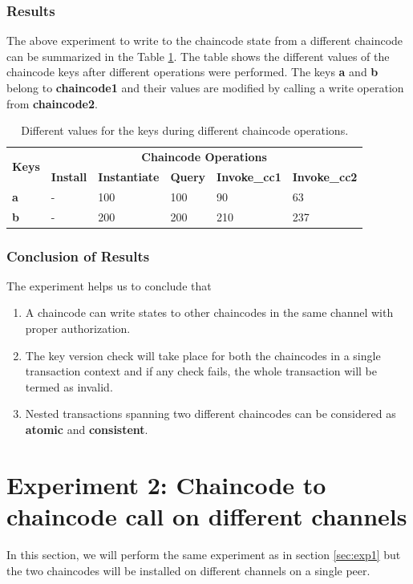 \documentclass[
  a4paper,  %
  twoside,  %
  bibliography=totoc,
  headsepline,
  cleardoublepage=empty,
  parskip=half,
  draft=false
]{scrbook}
\begin{document}
\subsubsection{Results}
The above experiment to write to the chaincode state from a  different chaincode can be summarized in the Table \ref{tab:result2}. The table shows the different values of the chaincode keys after different operations were performed. The keys \textbf{a} and \textbf{b} belong to \textbf{chaincode1} and their values are modified by calling a write operation from \textbf{chaincode2}.
\begin{table}[h!]
\begin{center}
    \begin{tabular}{ |l|l|l|l|l|l|}
    \hline
    \multirow{2}{*}{\textbf{Keys}} & \multicolumn{5}{c|}{\textbf{Chaincode Operations}}\\ \cline{2-6}
    &\textbf{Install}& \textbf{Instantiate}& \textbf{Query}& \textbf{Invoke\_cc1}& \textbf{Invoke\_cc2} \\ \hline
    \textbf{a} & - & 100 & 100 & 90 & 63 \\ \hline
    \textbf{b} & - & 200 & 200 & 210 & 237 \\ \hline
    \end{tabular}
\end{center}
\caption{Different values for the keys during different chaincode operations.}
\label{tab:result2}
\end{table}
\subsubsection{Conclusion of Results}
The experiment helps us to conclude that \begin{enumerate}
    \item A chaincode can write states to other chaincodes in the same channel with proper authorization.
    \item The key version check will take place for both the chaincodes in a single transaction context and if any check fails, the whole transaction will be termed as invalid. 
    \item Nested transactions spanning two different chaincodes can be considered as \textbf{atomic} and \textbf{consistent}.
\end{enumerate}

\section{Experiment 2: Chaincode to chaincode call on different channels}
In this section, we will perform the same experiment as in section \ref{sec:exp1} but the two chaincodes will be installed on different channels on a single peer.
\end{document}

